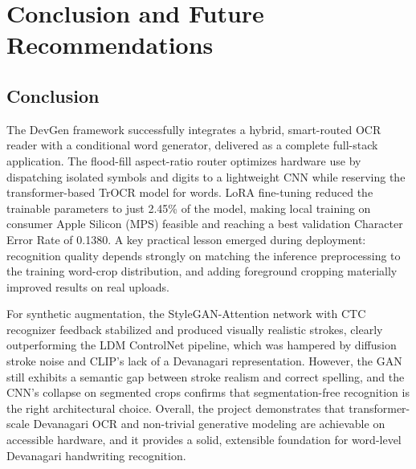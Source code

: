 \documentclass[12pt,a4paper]{report}
\begin{document}
\chapter{Conclusion and Future Recommendations}

\section{Conclusion}
The DevGen framework successfully integrates a hybrid, smart-routed OCR reader with a conditional word generator, delivered as a complete full-stack application. The flood-fill aspect-ratio router optimizes hardware use by dispatching isolated symbols and digits to a lightweight CNN while reserving the transformer-based TrOCR model for words. LoRA fine-tuning reduced the trainable parameters to just 2.45\% of the model, making local training on consumer Apple Silicon (MPS) feasible and reaching a best validation Character Error Rate of 0.1380. A key practical lesson emerged during deployment: recognition quality depends strongly on matching the inference preprocessing to the training word-crop distribution, and adding foreground cropping materially improved results on real uploads.

For synthetic augmentation, the StyleGAN-Attention network with CTC recognizer feedback stabilized and produced visually realistic strokes, clearly outperforming the LDM ControlNet pipeline, which was hampered by diffusion stroke noise and CLIP's lack of a Devanagari representation. However, the GAN still exhibits a semantic gap between stroke realism and correct spelling, and the CNN's collapse on segmented crops confirms that segmentation-free recognition is the right architectural choice. Overall, the project demonstrates that transformer-scale Devanagari OCR and non-trivial generative modeling are achievable on accessible hardware, and it provides a solid, extensible foundation for word-level Devanagari handwriting recognition.
\end{document}
